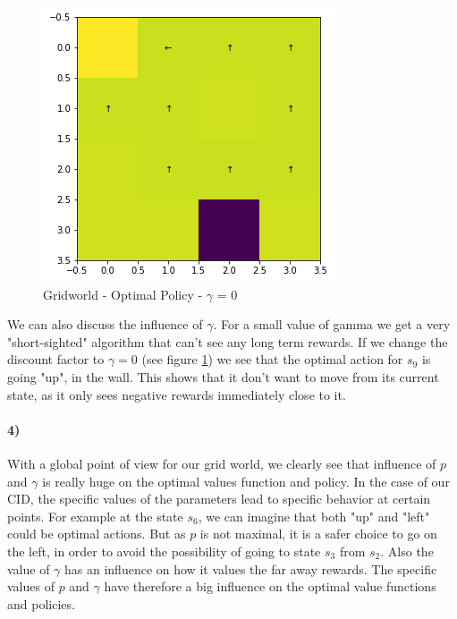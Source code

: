 \documentclass[11pt,a4paper]{article}
\numberwithin{equation}{section}
\begin{document}
\begin{figure}[H]
	\centering
	\includegraphics[width = 0.5\linewidth]{grid_g0}
	\caption{Gridworld - Optimal Policy - $\gamma$ = 0}
	\label{grid_g0}
\end{figure}

We can also discuss the influence of $\gamma$. For a small value of gamma we get a very "short-sighted" algorithm that can't see any long term rewards. If we change the discount factor to $\gamma =0$ (see figure \ref{grid_g0}) we see that the optimal action for $s_9$ is going "up", in the wall. This shows that it don't want to move from its current state, as it only sees negative rewards immediately close to it. 

\paragraph{4)}
With a global point of view for our grid world, we clearly see that influence of $p$ and $\gamma$ is really huge on the optimal values function and policy. In the case of our CID, the specific values of the parameters lead to specific behavior at certain points. For example at the state $s_6$, we can imagine that both "up" and "left" could be optimal actions. But as $p$ is not maximal, it is a safer choice to go on the left, in order to avoid the possibility of going to state $s_3$ from $s_2$. Also the value of $\gamma$ has an influence on how it values the far away rewards. The specific values of $p$ and $\gamma$ have therefore a big influence on the optimal value functions and policies. 





\end{document}
